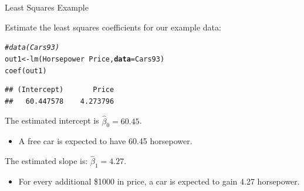 \documentclass[10pt]{beamer}\usepackage[]{graphicx}\usepackage[]{color}
\makeatletter
\newcommand{\hlcom}[1]{\textcolor[rgb]{0.514,0.506,0.514}{\textit{#1}}}%
\newcommand{\hlopt}[1]{\textcolor[rgb]{0,0,0}{#1}}%
\newcommand{\hlstd}[1]{\textcolor[rgb]{0,0,0}{#1}}%
\newcommand{\hlkwb}[1]{\textcolor[rgb]{0,0.341,0.682}{#1}}%
\newcommand{\hlkwc}[1]{\textcolor[rgb]{0,0,0}{\textbf{#1}}}%
\newcommand{\hlkwd}[1]{\textcolor[rgb]{0.004,0.004,0.506}{#1}}%
\newenvironment{kframe}{%
 \def\at@end@of@kframe{}%
 \ifinner\ifhmode%
  \def\at@end@of@kframe{\end{minipage}}%
  \begin{minipage}{\columnwidth}%
 \fi\fi%
 \def\FrameCommand##1{\hskip\@totalleftmargin \hskip-\fboxsep
 \colorbox{shadecolor}{##1}\hskip-\fboxsep
     \hskip-\linewidth \hskip-\@totalleftmargin \hskip\columnwidth}%
 \MakeFramed {\advance\hsize-\width
   \@totalleftmargin\z@ \linewidth\hsize
   \@setminipage}}%
 {\par\unskip\endMakeFramed%
 \at@end@of@kframe}
\newenvironment{knitrout}{}{} %
\makeatother
\begin{document}
\watermarkon %

\begin{frame}[fragile]{Least Squares Example}

  Estimate the least squares coefficients for our example data:

\begin{knitrout}\footnotesize
{}\color{fgcolor}\begin{kframe}
\begin{alltt}
\hlcom{#data(Cars93)}
\hlstd{out1} \hlkwb{<-} \hlkwd{lm}\hlstd{(Horsepower} \hlopt{~} \hlstd{Price,} \hlkwc{data} \hlstd{= Cars93)}
\hlkwd{coef}\hlstd{(out1)}
\end{alltt}
\begin{verbatim}
## (Intercept)       Price 
##   60.447578    4.273796
\end{verbatim}
\end{kframe}
\end{knitrout}



The estimated intercept is $\hat{\beta}_0 = 60.45$.
\begin{itemize}
\item A free car is expected to have 60.45 horsepower.
\end{itemize}
\vb
The estimated slope is: $\hat{\beta}_1 = 4.27$.
\begin{itemize}
\item For every additional \$1000 in price, a car is expected to gain 4.27
  horsepower.
\end{itemize}

\end{frame}



\watermarkoff %
\end{document}
